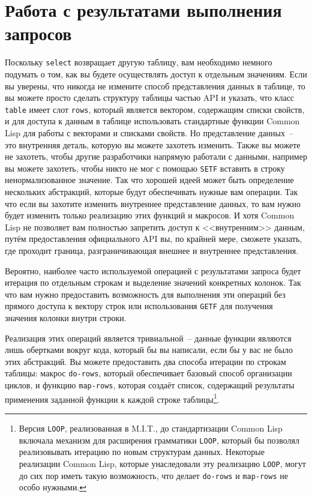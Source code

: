 \section{Работа с результатами выполнения запросов}

Поскольку \lstinline{select} возвращает другую таблицу, вам необходимо немного подумать о том,
как вы будете осуществлять доступ к отдельным значениям.  Если вы уверены, что никогда
не измените способ представления данных в таблице, то вы можете просто сделать структуру
таблицы частью API и указать, что класс \lstinline{table} имеет слот \lstinline{rows}, который
является вектором, содержащим списки свойств, и для доступа к данным в таблице использовать
стандартные функции Common Lisp для работы с векторами и списками свойств.  Но
представление данных~-- это внутренняя деталь, которую вы можете захотеть изменить.
Также вы можете не захотеть, чтобы другие разработчики напрямую работали с данными,
например вы можете захотеть, чтобы никто не мог с помощью \lstinline{SETF} вставить в строку
ненормализованное значение.  Так что хорошей идеей может быть определение нескольких
абстракций, которые будут обеспечивать нужные вам операции.  Так что если вы захотите
изменить внутреннее представление данных, то вам нужно будет изменить только реализацию
этих функций и макросов.  И хотя Common Lisp не позволяет вам полностью запретить доступ к
<<внутренним>> данным, путём предоставления официального API вы, по крайней мере, сможете
указать, где проходит граница, разграничивающая внешнее и внутреннее представления.

Вероятно, наиболее часто используемой операцией с результатами запроса будет итерация по
отдельным строкам и выделение значений конкретных колонок.  Так что вам нужно
предоставить возможность для выполнения эти операций без прямого доступа к вектору строк
или использования \lstinline{GETF} для получения значения колонки внутри строки.

Реализация этих операций является тривиальной~-- данные функции являются лишь обертками
вокруг кода, который бы вы написали, если бы у вас не было этих абстракций.  Вы можете
предоставить два способа итерации по строкам таблицы: макрос \lstinline{do-rows}, который
обеспечивает базовый способ организации циклов, и функцию \lstinline{map-rows}, которая создаёт
список, содержащий результаты применения заданной функции к каждой строке
таблицы\footnote{Версия \lstinline{LOOP}, реализованная в M.I.T., до стандартизации Common Lisp
  включала механизм для расширения грамматики \lstinline{LOOP}, который бы позволял
  реализовывать итерацию по новым структурам данных.  Некоторые реализации Common Lisp,
  которые унаследовали эту реализацию \lstinline{LOOP}, могут до сих пор иметь такую возможность,
  что делает \lstinline{do-rows} и \lstinline{map-rows} не особо нужными.}.

